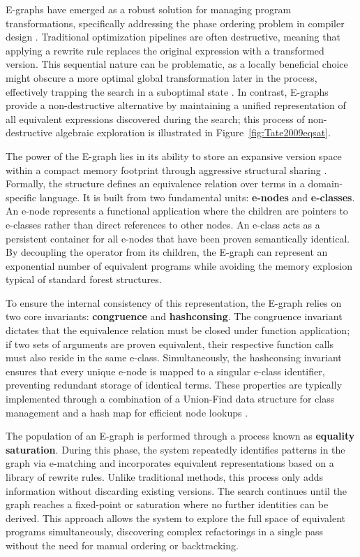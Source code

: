 \documentclass{thesis}
\begin{document}
E-graphs have emerged as a robust solution for managing program transformations, specifically addressing the phase ordering problem in compiler design \cite{wiki_egraph, Tate2009, Willsey2021}. Traditional optimization pipelines are often destructive, meaning that applying a rewrite rule replaces the original expression with a transformed version. This sequential nature can be problematic, as a locally beneficial choice might obscure a more optimal global transformation later in the process, effectively trapping the search in a suboptimal state \cite{Joshi2002}. In contrast, E-graphs provide a non-destructive alternative by maintaining a unified representation of all equivalent expressions discovered during the search; this process of non-destructive algebraic exploration is illustrated in Figure~\ref{fig:Tate2009eqsat}.

The power of the E-graph lies in its ability to store an expansive version space within a compact memory footprint through aggressive structural sharing \cite{Nelson1980, Willsey2021}. Formally, the structure defines an equivalence relation over terms in a domain-specific language. It is built from two fundamental units: \textbf{e-nodes} and \textbf{e-classes}. An e-node represents a functional application where the children are pointers to e-classes rather than direct references to other nodes. An e-class acts as a persistent container for all e-nodes that have been proven semantically identical. By decoupling the operator from its children, the E-graph can represent an exponential number of equivalent programs while avoiding the memory explosion typical of standard forest structures.

To ensure the internal consistency of this representation, the E-graph relies on two core invariants: \textbf{congruence} and \textbf{hashconsing}. The congruence invariant dictates that the equivalence relation must be closed under function application; if two sets of arguments are proven equivalent, their respective function calls must also reside in the same e-class. Simultaneously, the hashconsing invariant ensures that every unique e-node is mapped to a singular e-class identifier, preventing redundant storage of identical terms. These properties are typically implemented through a combination of a Union-Find data structure for class management and a hash map for efficient node lookups \cite{Willsey2021}.

The population of an E-graph is performed through a process known as \textbf{equality saturation}. During this phase, the system repeatedly identifies patterns in the graph via e-matching and incorporates equivalent representations based on a library of rewrite rules. Unlike traditional methods, this process only adds information without discarding existing versions. The search continues until the graph reaches a fixed-point or saturation where no further identities can be derived. This approach allows the system to explore the full space of equivalent programs simultaneously, discovering complex refactorings in a single pass without the need for manual ordering or backtracking.
\end{document}
